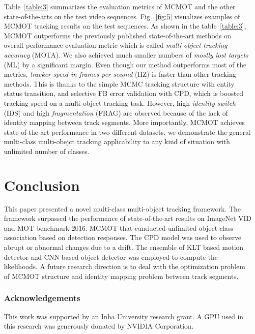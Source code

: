 \documentclass[runningheads]{llncs}
\begin{document}
Table~\ref{table:3} summarizes the evaluation metrics of MCMOT and the other state-of-the-arts on the test video sequences. Fig.~\ref{fig:5} visualizes examples of MCMOT tracking results on the test sequences. As shown in the table~\ref{table:3}, MCMOT outperforms the previously published state-of-the-art methods on overall performance evaluation metric which is called \textit{multi object tracking accuracy} (MOTA). We also achieved much smaller numbers of \textit{mostly lost targets} (ML) by a significant margin. Even though our method outperforms most of the metrics, \textit{tracker speed in frames per second} (HZ) is faster than other tracking methods. This is thanks to the simple MCMC tracking structure with entity status transition, and selective FB error validation with CPD, which is boosted tracking speed on a multi-object tracking task. However, high \textit{identity switch} (IDS) and high \textit{fragmentation} (FRAG) are observed because of the lack of identity mapping between track segments. More importantly, MCMOT achieves state-of-the-art performance in two different datasets, we demonstrate the general multi-class multi-obejct tracking applicability to any kind of situation with unlimited number of classes.

\section{Conclusion}
This paper presented a novel multi-class multi-object tracking framework. The framework surpassed the performance of state-of-the-art results on ImageNet VID and MOT benchmark 2016. MCMOT that cunducted unlimited object class association based on detection responses. The CPD model was used to observe abrupt or abnormal changes due to a drift. The ensemble of KLT based motion detector and CNN based object detector was employed to compute the likelihoods. A future research direction is to deal with the optimization problem of MCMOT structure and identity mapping problem between track segments.

\subsubsection{Acknowledgements} This work was supported by an Inha University research grant. A GPU used in this research was generously donated by NVIDIA Corporation.

\clearpage


\end{document}
